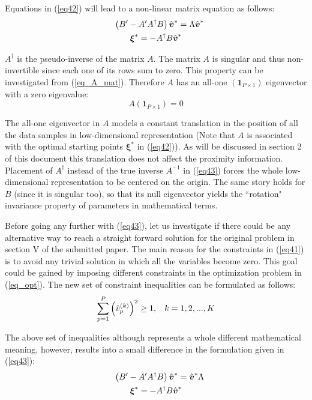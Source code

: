\documentclass[10pt,journal,cspaper,compsoc]{IEEEtran}
\begin{document}
Equations in (\ref{eq42}) will lead to a non-linear matrix equation as follows:
\begin{gather}
\label{eq43}
\hspace{3mm} \left(B'-A'A^{\dagger}B\right)\hat{\boldsymbol{v}}^*=\Lambda\hat{\boldsymbol{v}}^* \\
\boldsymbol{\xi}^*=-A^{\dagger}B\hat{\boldsymbol{v}}^* \nonumber
\end{gather}

$A^\dagger$ is the pseudo-inverse of the matrix $A$. The matrix $A$ is singular and thus non-invertible since each one of its rows sum to zero. This property can be investigated from (\ref{eq_A_mat}). Therefore $A$ has an all-one $\left(\boldsymbol{1}_{P\times 1}\right)$ eigenvector with a zero eigenvalue:
\begin{equation}
\label{all_one_eigenvector}
A\left(\boldsymbol{1}_{P\times 1}\right)=0
\end{equation} 

The all-one eigenvector in $A$ models a constant translation in the position of all the data samples in low-dimensional representation (Note that $A$ is associated with the optimal starting points $\boldsymbol{\xi}^*$ in (\ref{eq42})). As will be discussed in section 2 of this document this translation does not affect the proximity information. Placement of $A^{\dagger}$ instead of the true inverse $A^{-1}$ in (\ref{eq43}) forces the whole low-dimensional representation to be centered on the origin. The same story holds for $B$ (since it is singular too), so that its null eigenvector yields the ``rotation" invariance property of parameters in mathematical terms.

Before going any further with (\ref{eq43}), let us investigate if there could be any alternative way to reach a straight forward solution for the original problem in section V of the submitted paper. The main reason for the constraints in (\ref{eq41}) is to avoid any trivial solution in which all the variables become zero. This goal could be gained by imposing different constraints in the optimization problem in (\ref{eq_opt}). The new set of constraint inequalities can be formulated as follows:
\begin{equation}
\label{eq44}
\sum_{p=1}^{P}\left(\hat{v}_p^{(k)}\right)^2\ge1, \hspace{3mm} k=1,2,...,K
\end{equation}

The above set of inequalities although represents a whole different mathematical meaning, however, results into a small difference in the formulation given in (\ref{eq43}):
\begin{gather}
\label{eq45}
\hspace{3mm} \left(B'-A'A^{\dagger}B\right)\hat{\boldsymbol{v}}^*=\hat{\boldsymbol{v}}^*\Lambda \\
\boldsymbol{\xi}^*=-A^{\dagger}B\hat{\boldsymbol{v}}^* \nonumber
\end{gather}
\end{document}
